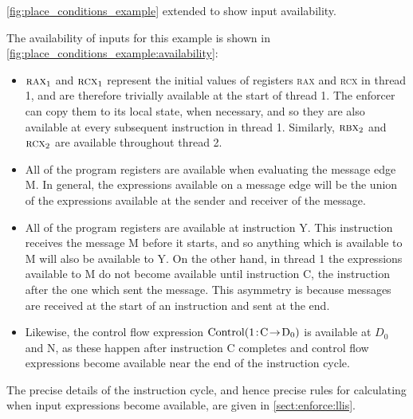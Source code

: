 \begin{sanefig}
  \vspace{-12pt}
  \caption{\autoref{fig:place_conditions_example} extended to show
    input availability.}
  \label{fig:place_conditions_example:availability}
\end{sanefig}

The availability of inputs for this example is shown in
\autoref{fig:place_conditions_example:availability}:
\begin{itemize}
\item $\textsc{rax}_1$ and $\textsc{rcx}_1$ represent the initial
  values of registers \textsc{rax} and \textsc{rcx} in thread 1, and
  are therefore trivially available at the start of thread 1.  The
  enforcer can copy them to its local state, when necessary, and so
  they are also available at every subsequent instruction in thread 1.
  Similarly, $\textsc{rbx}_2$ and $\textsc{rcx}_2$ are available
  throughout thread 2.
\item All of the program registers are available when evaluating the
  message edge M.  In general, the expressions available on a message
  edge will be the union of the expressions available at the sender and
  receiver of the message.
\item All of the program registers are available at instruction Y.
  This instruction receives the message M before it starts, and so
  anything which is available to M will also be available to Y.  On
  the other hand, in thread 1 the expressions available to M do not
  become available until instruction C, the instruction after the one
  which sent the message.  This asymmetry is because messages are
  received at the start of an instruction and sent at the end.
\item Likewise, the control flow expression ${\mathrm{Control}}(\mathrm{1}\!:\!\mathrm{C}\!\rightarrow\!\mathrm{D_0})$
  is available at $D_0$ and N, as these happen after instruction C
  completes and control flow expressions become available near the end
  of the instruction cycle.
\end{itemize}
The precise details of the instruction cycle, and hence precise rules
for calculating when input expressions become available, are given in
\autoref{sect:enforce:llis}.

